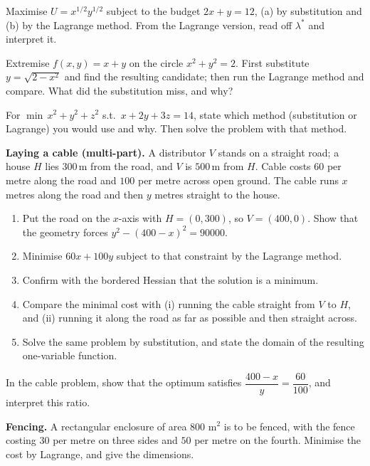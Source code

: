 \begin{problems}
  \item Maximise $U = x^{1/2} y^{1/2}$ subject to the budget $2 x + y = 12$, (a) by substitution and (b) by the Lagrange method. From the Lagrange version, read off $\lambda^*$ and interpret it.
  \item Extremise $f(x, y) = x + y$ on the circle $x^2 + y^2 = 2$. First substitute $y = \sqrt{2 - x^2}$ and find the resulting candidate; then run the Lagrange method and compare. What did the substitution miss, and why?
  \item For $\min\, x^2 + y^2 + z^2$ s.t.\ $x + 2 y + 3 z = 14$, state which method (substitution or Lagrange) you would use and why. Then solve the problem with that method.

  \item \textbf{Laying a cable (multi-part).} A distributor $V$ stands on a
        straight road; a house $H$ lies $300$\,m from the road, and $V$ is
        $500$\,m from $H$. Cable costs $60$ per metre along the road and
        $100$ per metre across open ground. The cable runs $x$ metres along
        the road and then $y$ metres straight to the house.
        \begin{enumerate}[label=(\alph*),leftmargin=1.6em,itemsep=0.2ex]
          \item Put the road on the $x$-axis with $H=(0,300)$, so
                $V=(400,0)$. Show that the geometry forces
                $y^{2}-(400-x)^{2}=90000$.
          \item Minimise $60x+100y$ subject to that constraint by the
                Lagrange method.
          \item Confirm with the bordered Hessian that the solution is a
                minimum.
          \item Compare the minimal cost with (i) running the cable
                straight from $V$ to $H$, and (ii) running it along the
                road as far as possible and then straight across.
          \item Solve the same problem by substitution, and state the
                domain of the resulting one-variable function.
        \end{enumerate}
  \item In the cable problem, show that the optimum satisfies
        $\dfrac{400-x}{y}=\dfrac{60}{100}$, and interpret this ratio.
  \item \textbf{Fencing.} A rectangular enclosure of area $800$ m$^{2}$ is
        to be fenced, with the fence costing $30$ per metre on three sides
        and $50$ per metre on the fourth. Minimise the cost by Lagrange,
        and give the dimensions.


\end{problems}
